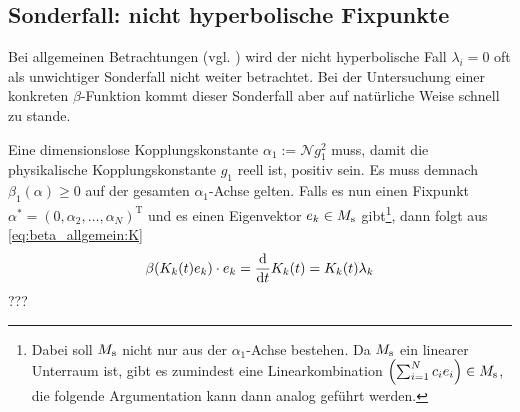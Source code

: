   \subsection{Sonderfall: nicht hyperbolische Fixpunkte}
    Bei allgemeinen Betrachtungen (vgl. \cite{Weinberg:1976}) 
    wird der nicht hyperbolische Fall $\lambda_i = 0$ oft als unwichtiger Sonderfall nicht 
    weiter betrachtet. Bei der Untersuchung einer konkreten $\beta$-Funktion kommt dieser 
    Sonderfall aber auf natürliche Weise schnell zu stande.
    
    Eine dimensionslose Kopplungskonstante $\alpha_1:=\mathcal{N}g_1^2$ muss, damit die 
    physikalische Kopplungskonstante $g_1$ reell ist, positiv sein. Es muss demnach 
    $\beta_1(\alpha)\geq 0$ auf der gesamten $\alpha_1$-Achse gelten. Falls es nun einen 
    Fixpunkt $\alpha^*=(0,\alpha_2,\ldots,\alpha_N)^\text{T}$ und es einen Eigenvektor
    $e_k\in M_\text{s}$ gibt\footnote{Dabei 
    soll $M_\text{s}$ nicht nur aus der $\alpha_1$-Achse bestehen. Da $M_\text{s}$ ein linearer Unterraum 
    ist, gibt es zumindest eine Linearkombination $\left(\sum_{i=1}^N c_ie_i\right)\in M_\text{s}$, 
    die folgende Argumentation kann dann analog geführt werden.},
    dann folgt aus \eqref{eq:beta_allgemein:K}
    \begin{equation}
     \beta(K_k(t)e_k)\cdot e_k = \frac{\text{d}}{\text{d} t} K_k(t) = K_k(t) \lambda_k
    \end{equation}
    ???
    
